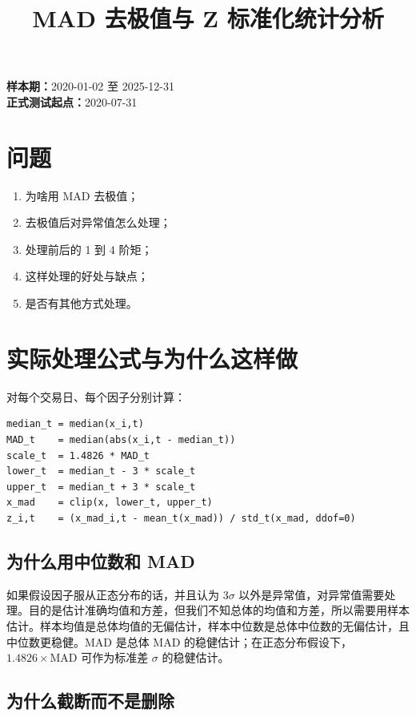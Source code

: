 \documentclass[UTF8,11pt,a4paper,fontset=windows]{ctexart}
\title{MAD 去极值与 Z 标准化统计分析}
\author{}
\date{}
\begin{document}
\maketitle

\noindent\textbf{样本期：}2020-01-02 至 2025-12-31\\
\textbf{正式测试起点：}2020-07-31

\section{问题}

\begin{enumerate}
  \item 为啥用 MAD 去极值；
  \item 去极值后对异常值怎么处理；
  \item 处理前后的 1 到 4 阶矩；
  \item 这样处理的好处与缺点；
  \item 是否有其他方式处理。
\end{enumerate}

\section{实际处理公式与为什么这样做}

对每个交易日、每个因子分别计算：

\begin{Verbatim}[fontsize=\small,breaklines=true]
median_t = median(x_i,t)
MAD_t    = median(abs(x_i,t - median_t))
scale_t  = 1.4826 * MAD_t
lower_t  = median_t - 3 * scale_t
upper_t  = median_t + 3 * scale_t
x_mad    = clip(x, lower_t, upper_t)
z_i,t    = (x_mad_i,t - mean_t(x_mad)) / std_t(x_mad, ddof=0)
\end{Verbatim}

\subsection{为什么用中位数和 MAD}

如果假设因子服从正态分布的话，并且认为 \(3\sigma\) 以外是异常值，对异常值需要处理。目的是估计准确均值和方差，但我们不知总体的均值和方差，所以需要用样本估计。样本均值是总体均值的无偏估计，样本中位数是总体中位数的无偏估计，且中位数更稳健。MAD 是总体 MAD 的稳健估计；在正态分布假设下，\(1.4826\times\mathrm{MAD}\) 可作为标准差 \(\sigma\) 的稳健估计。

\subsection{为什么截断而不是删除}
\end{document}
